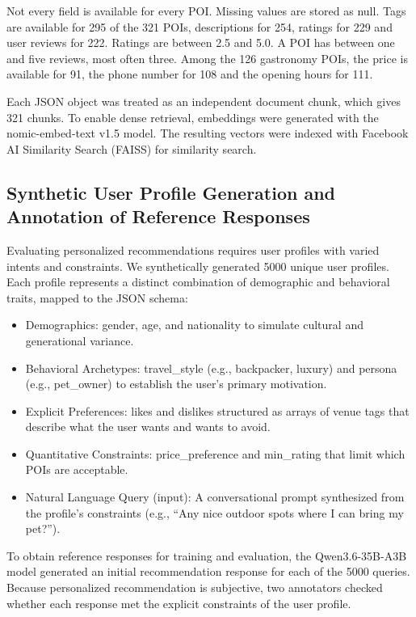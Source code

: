 \documentclass[journal,article,submit,pdftex,moreauthors]{Definitions/mdpi}
\begin{document}
Not every field is available for every POI. Missing values are stored as null. Tags are available for 295 of the 321 POIs, descriptions for 254, ratings for 229 and user reviews for 222. Ratings are between 2.5 and 5.0. A POI has between one and five reviews, most often three. Among the 126 gastronomy POIs, the price is available for 91, the phone number for 108 and the opening hours for 111.

Each JSON object was treated as an independent document chunk, which gives 321 chunks. To enable dense retrieval, embeddings were generated with the nomic-embed-text v1.5 model. The resulting vectors were indexed with Facebook AI Similarity Search (FAISS) for similarity search.

\subsection{Synthetic User Profile Generation and Annotation of Reference Responses}\label{sec:reference}
Evaluating personalized recommendations requires user profiles with varied intents and constraints. We synthetically generated 5000 unique user profiles. Each profile represents a distinct combination of demographic and behavioral traits, mapped to the JSON schema:

\begin{itemize}[labelsep=2.5mm,topsep=-3pt]
\item Demographics: gender, age, and nationality to simulate cultural and generational variance.
\item Behavioral Archetypes: travel\_style (e.g., backpacker, luxury) and persona (e.g., pet\_owner) to establish the user's primary motivation.
\item Explicit Preferences: likes and dislikes structured as arrays of venue tags that describe what the user wants and wants to avoid.
\item Quantitative Constraints: price\_preference and min\_rating that limit which POIs are acceptable.
\item Natural Language Query (input): A conversational prompt synthesized from the profile's constraints (e.g., ``Any nice outdoor spots where I can bring my pet?'').
\end{itemize}\vspace{3pt}

To obtain reference responses for training and evaluation, the Qwen3.6-35B-A3B model generated an initial recommendation response for each of the 5000 queries. Because personalized recommendation is subjective, two annotators checked whether each response met the explicit constraints of the user profile.
\end{document}
